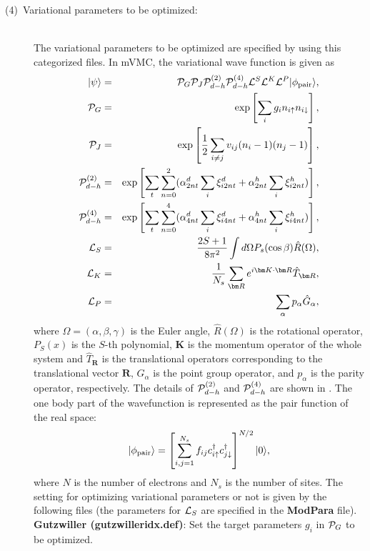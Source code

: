 \begin{description}
\item[(4)~Variational parameters to be optimized:] 
~\\The variational parameters to be optimized are specified by using this categorized files. In mVMC, the variational wave function is given as
\begin{eqnarray}
|\psi \rangle &=& {\cal P}_G{\cal P}_J{\cal P}_{d-h}^{(2)}{\cal P}_{d-h}^{(4)}{\cal L}^S{\cal L}^K{\cal L}^P |\phi_{\rm pair} \rangle,\\
{\cal P}_G&=&\exp\left[ \sum_i g_i n_{i\uparrow} n_{i\downarrow} \right],\\
{\cal P}_J&=&\exp\left[\frac{1}{2} \sum_{i\neq j} v_{ij} (n_i-1)(n_j-1)\right],\\
{\cal P}_{d-h}^{(2)}&=& \exp \left[ \sum_t \sum_{n=0}^2 (\alpha_{2nt}^d \sum_{i}\xi_{i2nt}^d+\alpha_{2nt}^h \sum_{i}\xi_{i2nt}^h)\right],\\
{\cal P}_{d-h}^{(4)}&=& \exp \left[ \sum_t \sum_{n=0}^4 (\alpha_{4nt}^d \sum_{i}\xi_{i4nt}^d+\alpha_{4nt}^h \sum_{i}\xi_{i4nt}^h)\right],\\
{\cal L}_S&=&\frac{2S+1}{8 \pi^2}\int d\Omega P_s(\cos \beta) \hat{R}(\Omega),\\
{\cal L}_K&=&\frac{1}{N_s}\sum_{{\bm R}}e^{i {\bm K} \cdot{\bm R} } \hat{T}_{\bm R},\\
{\cal L}_P&=&\sum_{\alpha}p_{\alpha} \hat{G}_{\alpha},
\end{eqnarray}
where $\Omega=(\alpha, \beta, \gamma)$ is the Euler angle, $\hat{R}(\Omega)$ is the rotational operator, $P_S(x)$ is the $S$-th polynomial, ${\bm K}$ is the momentum operator of the whole system and $\hat{T}_{\bm R}$ is the translational operators corresponding to the translational vector ${\bm R}$, $\hat{G}_{\alpha}$ is the point group operator, and $p_\alpha$ is the parity operator, respectively. The details of ${\cal P}_{d-h}^{(2)}$ and ${\cal P}_{d-h}^{(4)}$ are shown in \cite{Tahara2008}. The one body part of the wavefunction is represented as the pair function of the real space:
\begin{equation}
|\phi_{\rm pair} \rangle = \left[\sum_{i, j=1}^{N_s} f_{ij}c_{i\uparrow}^{\dag}c_{j\downarrow}^{\dag} \right]^{N/2}|0 \rangle,
\end{equation}
where $N$ is the number of electrons and $N_s$ is the number of sites.
The setting for optimizing variational parameters or not is given by the following files (the parameters for ${\cal L}_S$ are specified in the {\bf ModPara} file).
~\\{\bf Gutzwiller  (gutzwilleridx.def)}: Set the target parameters $g_i$ in ${\cal P}_G$ to be optimized.

\end{description}
